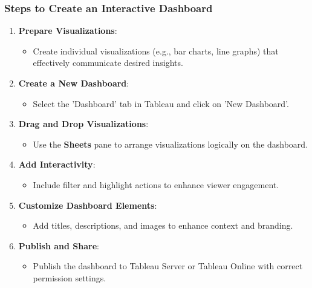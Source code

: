 \documentclass[aspectratio=169]{beamer}
\begin{document}
\begin{frame}[fragile]
    \frametitle{Steps to Create an Interactive Dashboard}
    \begin{enumerate}
        \item \textbf{Prepare Visualizations}:
        \begin{itemize}
            \item Create individual visualizations (e.g., bar charts, line graphs) that effectively communicate desired insights.
        \end{itemize}
        
        \item \textbf{Create a New Dashboard}:
        \begin{itemize}
            \item Select the 'Dashboard' tab in Tableau and click on 'New Dashboard'.
        \end{itemize}
        
        \item \textbf{Drag and Drop Visualizations}:
        \begin{itemize}
            \item Use the \textbf{Sheets} pane to arrange visualizations logically on the dashboard.
        \end{itemize}
        
        \item \textbf{Add Interactivity}:
        \begin{itemize}
            \item Include filter and highlight actions to enhance viewer engagement.
        \end{itemize}
        
        \item \textbf{Customize Dashboard Elements}:
        \begin{itemize}
            \item Add titles, descriptions, and images to enhance context and branding.
        \end{itemize}
        
        \item \textbf{Publish and Share}:
        \begin{itemize}
            \item Publish the dashboard to Tableau Server or Tableau Online with correct permission settings.
        \end{itemize}
    \end{enumerate}
\end{frame}
\end{document}
